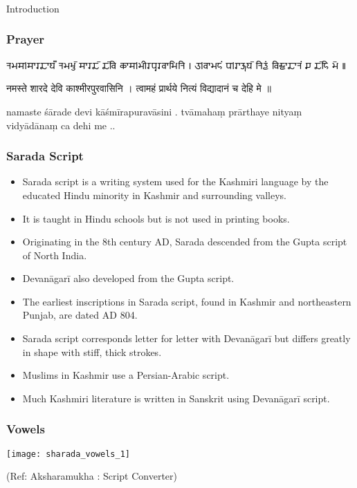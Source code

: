 \begin{frame}[fragile]\frametitle{}
\begin{center}
{\Large Introduction}
\end{center}
\end{frame}


\begin{frame}[fragile]\frametitle{Prayer}

{\sharadafont 𑆤𑆩𑆯𑇀𑆯𑆳𑆫𑆢𑆳𑆪𑆽 𑆤𑆩𑆱𑇀𑆠𑆼 𑆯𑆳𑆫𑆢𑆼 𑆢𑆼𑆮𑆴 𑆑𑆳𑆯𑇀𑆩𑆵𑆫𑆥𑆶𑆫𑆮𑆳𑆱𑆴𑆤𑆴 𑇅 𑆠𑇀𑆮𑆳𑆩𑆲𑆁 𑆥𑇀𑆫𑆳𑆫𑇀𑆡𑆪𑆼 𑆤𑆴𑆠𑇀𑆪𑆁 𑆮𑆴𑆢𑇀𑆪𑆳𑆢𑆳𑆤𑆁 𑆖 𑆢𑆼𑆲𑆴 𑆩𑆼 𑇆}

नमस्ते शारदे देवि काश्मीरपुरवासिनि । त्वामहं प्रार्थये नित्यं विद्यादानं च देहि मे ॥

namaste śārade devi kāśmīrapuravāsini . tvāmahaṃ prārthaye nityaṃ vidyādānaṃ ca dehi me ..

\end{frame}

\begin{frame}[fragile]\frametitle{Sarada Script}

\begin{itemize}
    \item Sarada script is a writing system used for the Kashmiri language by the educated Hindu minority in Kashmir and surrounding valleys.
    \item It is taught in Hindu schools but is not used in printing books.
    \item Originating in the 8th century AD, Sarada descended from the Gupta script of North India.
    \item Devanāgarī also developed from the Gupta script.
    \item The earliest inscriptions in Sarada script, found in Kashmir and northeastern Punjab, are dated AD 804.
    \item Sarada script corresponds letter for letter with Devanāgarī but differs greatly in shape with stiff, thick strokes.
    \item Muslims in Kashmir use a Persian-Arabic script.
    \item Much Kashmiri literature is written in Sanskrit using Devanāgarī script.
\end{itemize}

\end{frame}

\begin{frame}[fragile]\frametitle{Vowels}

	\begin{center}
	\texttt{[image: sharada\_vowels\_1]} 
	
	{\tiny (Ref: Aksharamukha : Script Converter)}
	\end{center}	

\end{frame}

